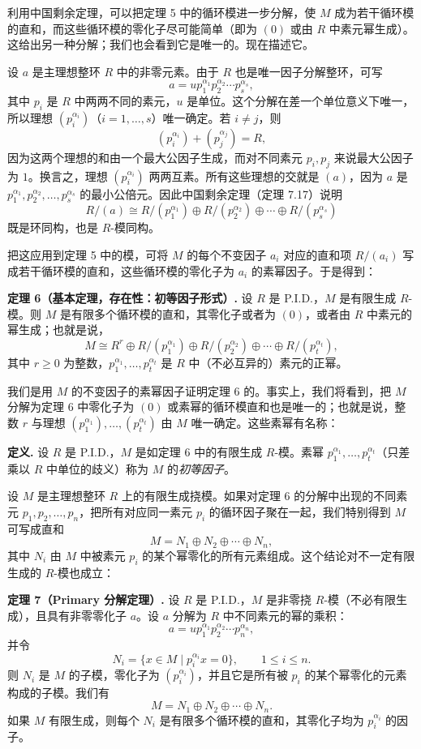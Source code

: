 利用中国剩余定理，可以把定理 5 中的循环模进一步分解，使 $M$ 成为若干循环模的直和，而这些循环模的零化子尽可能简单（即为 $(0)$ 或由 $R$ 中素元幂生成）。这给出另一种分解；我们也会看到它是唯一的。现在描述它。

设 $a$ 是主理想整环 $R$ 中的非零元素。由于 $R$ 也是唯一因子分解整环，可写
\[
a=up_1^{\alpha_1}p_2^{\alpha_2}\cdots p_s^{\alpha_s},
\]
其中 $p_i$ 是 $R$ 中两两不同的素元，$u$ 是单位。这个分解在差一个单位意义下唯一，所以理想 $(p_i^{\alpha_i})$（$i=1,\ldots,s$）唯一确定。若 $i\neq j$，则
\[
(p_i^{\alpha_i})+(p_j^{\alpha_j})=R,
\]
因为这两个理想的和由一个最大公因子生成，而对不同素元 $p_i,p_j$ 来说最大公因子为 $1$。换言之，理想 $(p_i^{\alpha_i})$ 两两互素。所有这些理想的交就是 $(a)$，因为 $a$ 是 $p_1^{\alpha_1},p_2^{\alpha_2},\ldots,p_s^{\alpha_s}$ 的最小公倍元。因此中国剩余定理（定理 7.17）说明
\[
R/(a)\cong R/(p_1^{\alpha_1})\oplus R/(p_2^{\alpha_2})\oplus\cdots\oplus R/(p_s^{\alpha_s})
\]
既是环同构，也是 $R$-模同构。

把这应用到定理 5 中的模，可将 $M$ 的每个不变因子 $a_i$ 对应的直和项 $R/(a_i)$ 写成若干循环模的直和，这些循环模的零化子为 $a_i$ 的素幂因子。于是得到：

\noindent\textbf{定理 6（基本定理，存在性：初等因子形式）.} 设 $R$ 是 P.I.D.，$M$ 是有限生成 $R$-模。则 $M$ 是有限多个循环模的直和，其零化子或者为 $(0)$，或者由 $R$ 中素元的幂生成；也就是说，
\[
M\cong R^r\oplus R/(p_1^{\alpha_1})\oplus R/(p_2^{\alpha_2})\oplus\cdots\oplus R/(p_t^{\alpha_t}),
\]
其中 $r\geq0$ 为整数，$p_1^{\alpha_1},\ldots,p_t^{\alpha_t}$ 是 $R$ 中（不必互异的）素元的正幂。

我们是用 $M$ 的不变因子的素幂因子证明定理 6 的。事实上，我们将看到，把 $M$ 分解为定理 6 中零化子为 $(0)$ 或素幂的循环模直和也是唯一的；也就是说，整数 $r$ 与理想 $(p_1^{\alpha_1}),\ldots,(p_t^{\alpha_t})$ 由 $M$ 唯一确定。这些素幂有名称：

\noindent\textbf{定义.} 设 $R$ 是 P.I.D.，$M$ 是如定理 6 中的有限生成 $R$-模。素幂 $p_1^{\alpha_1},\ldots,p_t^{\alpha_t}$（只差乘以 $R$ 中单位的歧义）称为 $M$ 的\emph{初等因子}。

设 $M$ 是主理想整环 $R$ 上的有限生成挠模。如果对定理 6 的分解中出现的不同素元 $p_1,p_2,\ldots,p_n$，把所有对应同一素元 $p_i$ 的循环因子聚在一起，我们特别得到 $M$ 可写成直和
\[
M=N_1\oplus N_2\oplus\cdots\oplus N_n,
\]
其中 $N_i$ 由 $M$ 中被素元 $p_i$ 的某个幂零化的所有元素组成。这个结论对不一定有限生成的 $R$-模也成立：

\noindent\textbf{定理 7（Primary 分解定理）.} 设 $R$ 是 P.I.D.，$M$ 是非零挠 $R$-模（不必有限生成），且具有非零零化子 $a$。设 $a$ 分解为 $R$ 中不同素元的幂的乘积：
\[
a=up_1^{\alpha_1}p_2^{\alpha_2}\cdots p_n^{\alpha_n},
\]
并令
\[
N_i=\{x\in M\mid p_i^{\alpha_i}x=0\},\qquad 1\leq i\leq n.
\]
则 $N_i$ 是 $M$ 的子模，零化子为 $(p_i^{\alpha_i})$，并且它是所有被 $p_i$ 的某个幂零化的元素构成的子模。我们有
\[
M=N_1\oplus N_2\oplus\cdots\oplus N_n.
\]
如果 $M$ 有限生成，则每个 $N_i$ 是有限多个循环模的直和，其零化子均为 $p_i^{\alpha_i}$ 的因子。

